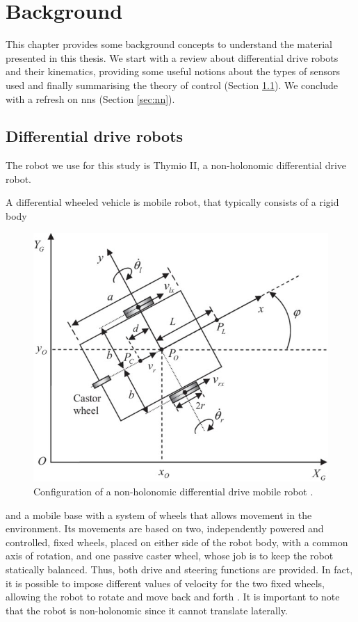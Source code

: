 \chapter{Background}
\label{chap:background}
This chapter provides some background concepts to understand the material 
presented in this thesis. 
We start with a review about differential drive robots and their kinematics, 
providing some useful notions about the types of sensors used and finally 
summarising the theory of control (Section \ref{sec:ddr}).
We conclude with a refresh on \glspl{nn} (Section \ref{sec:nn}).

\section{Differential drive robots}
\label{sec:ddr}
The robot we use for this study is Thymio II, a non-holonomic differential drive 
robot.

A differential wheeled vehicle is mobile robot, that typically consists of a rigid 
body 
\begin{figure}[!htb]
	\centering
	\includegraphics[width=.55\textwidth]{contents/images/Non-holonomic-differential-drive-mobile-robot}
	\caption[Non-holonomic differential drive mobile robot.]{Configuration of a 
		non-holonomic differential drive mobile robot 
		\cite[][]{shojaei2011adaptive}.}
	\label{fig:differentialdrive}
\end{figure}

\noindent
and a mobile base with a system of wheels that allows movement in the 
environment. 
Its movements are based on two, independently powered and 
controlled, fixed wheels, placed on either side of the robot body, with a common 
axis of rotation, and one passive caster wheel, whose job is to keep the robot 
statically balanced. 
Thus, both drive and steering functions are provided. In fact, it is possible to 
impose different values of velocity for the two fixed wheels, allowing the robot to 
rotate and move back and forth \cite[][]{siciliano2010robotics}. It is important to 
note that the robot is non-holonomic since it cannot translate laterally.

